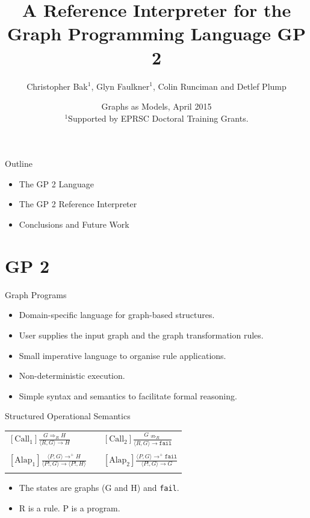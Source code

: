 \documentclass[14pt]{beamer}
\title{\textbf{A Reference Interpreter for the Graph Programming Language GP 2}}
\author{Christopher Bak$^1$, Glyn Faulkner$^1$, Colin Runciman and Detlef Plump}
\institute{Department of Computer Science, The University of York}
\date[GaM 2015]{Graphs as Models, April 2015\\[1em]
{\scriptsize $^1$Supported by EPRSC Doctoral Training Grants.}}
\begin{document}
\begin{frame}
  \titlepage
\end{frame}

\begin{frame}{Outline}
\begin{itemize}\setlength{\itemsep}{10mm}
\item The GP 2 Language
\item The GP 2 Reference Interpreter
\item Conclusions and Future Work
\end{itemize}
\end{frame}

\section{GP 2}

\begin{frame}{Graph Programs}
\begin{itemize}
\item Domain-specific language for graph-based structures.
\item User supplies the input graph and the graph transformation rules.
\item Small imperative language to organise rule applications.
\item Non-deterministic execution.
\item Simple syntax and semantics to facilitate formal reasoning.
\end{itemize}
\end{frame}

\begin{frame}{Structured Operational Semantics}
\begin{center}
\begin{tabular}{lcl}
$\mathrm{[Call_1]} \displaystyle\frac{G \Rightarrow_{R} H}{\langle R,G\rangle \to H}$ 
&&
$\mathrm{[Call_2]} \displaystyle\frac{G \nRightarrow_{R}}{\langle R,G\rangle \to \texttt{fail}}$ 
\\\\
$\mathrm{[Alap_1]} \displaystyle\frac{\langle P, G\rangle \to^+ H}{\langle P!, G\rangle \to \langle P!, H\rangle}$ 
&&
$\mathrm{[Alap_2]} \displaystyle\frac{\langle P, G\rangle \to^+ \texttt{fail}}{\langle P!, G\rangle \to G}$ 
\\\\
\end{tabular} 
\end{center}
\begin{itemize}
\item The states are graphs (G and H) and \texttt{fail}.
\item R is a rule. P is a program.
\end{itemize}
\end{frame}
\end{document}
